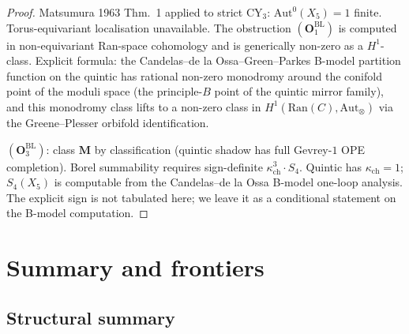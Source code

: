 \documentclass[11pt]{amsart}
\newcommand{\kch}{\kappa_{\mathrm{ch}}}
\newcommand{\Ran}{\mathrm{Ran}}
\newcommand{\Aut}{\mathrm{Aut}}
\begin{document}
\begin{proof}
Matsumura 1963 Thm.\ 1 applied to strict CY$_3$: $\Aut^0(X_5) = 1$
finite. Torus-equivariant localisation unavailable. The
obstruction $(\mathbf{O}_1^{\mathrm{BL}})$ is computed in
non-equivariant Ran-space cohomology and is generically non-zero
as a $H^1$-class. Explicit formula: the Candelas--de la Ossa--Green--Parkes
B-model partition function on the quintic has rational non-zero
monodromy around the conifold point of the moduli space (the
principle-$B$ point of the quintic mirror family), and this
monodromy class lifts to a non-zero class in
$H^1(\Ran(C), \mathrm{Aut}_\otimes)$ via the Greene--Plesser
orbifold identification.

$(\mathbf{O}_3^{\mathrm{BL}})$: class $\mathbf{M}$ by
classification (quintic shadow has full Gevrey-$1$ OPE completion).
Borel summability requires sign-definite $\kch^3 \cdot S_4$.
Quintic has $\kch = 1$; $S_4(X_5)$ is computable from the
Candelas--de la Ossa B-model one-loop analysis. The explicit
sign is not tabulated here; we leave it as a conditional
statement on the B-model computation.
\end{proof}

\section{Summary and frontiers}
\label{sec:summary-frontiers}

\subsection{Structural summary}
\end{document}
